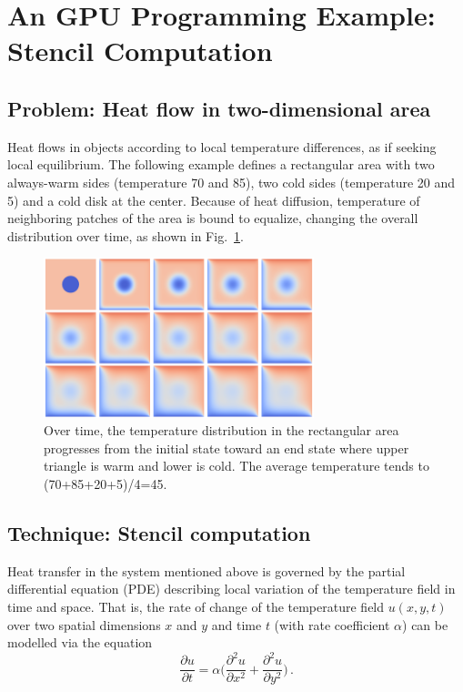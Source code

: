 \section{An GPU Programming Example: Stencil Computation}


\subsection{Problem: Heat flow in two-dimensional area}


\par
Heat flows in objects according to local temperature differences, as if seeking local equilibrium.
The following example defines a rectangular area with two always-warm sides (temperature 70 and 85), two cold sides (temperature 20 and 5) and a cold disk at the center.
Because of heat diffusion, temperature of neighboring patches of the area is bound to equalize, changing the overall distribution over time, as shown in Fig.~\ref{fig:heat_montage}.

\begin{figure}[!htbp]
\centering\includegraphics[width=0.7\textwidth]{fig_problem/heat_montage.png}
\caption{Over time, the temperature distribution in the rectangular area progresses from the initial state toward an end state where upper triangle is warm and lower is cold. The average temperature tends to (70+85+20+5)/4=45.}\label{fig:heat_montage}
\end{figure}




\subsection{Technique: Stencil computation}


\par
Heat transfer in the system mentioned above is governed by the partial differential equation (PDE) describing local variation of the temperature field in time and space.
That is, the rate of change of the temperature field $u(x,y,t)$ over two spatial dimensions $x$ and $y$ and time $t$ (with rate coefficient $\alpha$) can be modelled via the equation
\begin{equation}
    \frac{\partial u}{\partial t} = \alpha \Big(\frac{\partial^2u}{\partial x^2} + \frac{\partial^2u}{\partial y^2}\Big) \,. \label{eq:heat_diffusion_pde}
\end{equation}


